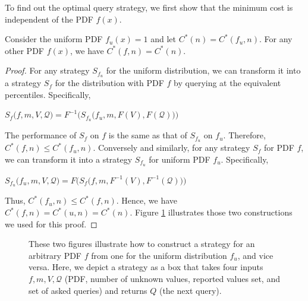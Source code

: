 To find out the optimal query strategy, we first show that the minimum cost
is independent of the PDF $f(x)$.

\begin{lemma}\label{lemma:uniform}
Consider the uniform PDF $f_u(x) = 1$ and let $C^*(n) = C^*(f_u, n)$.
For any other PDF $f(x)$, we have $C^*(f, n) =  C^*(n)$.
\end{lemma}


\begin{proof}
For any strategy $S_{f_u}$ for the uniform distribution, we can transform
it into a strategy $S_f$ for the distribution  with PDF $f$ 
by querying at the equivalent percentiles. Specifically, 

$
S_f\big(f, m, V, \mathcal Q \big) = F^{-1}\Big( S_{f_u}\big( f_u, m, F(V), F (\mathcal Q) \big) \Big)
$

The performance of $S_f$ on $f$ is the same as that of $S_{f_u}$ on $f_u$.
Therefore,  $C^*(f, n) \leq C^*(f_u, n)$.
Conversely and similarly, for any strategy $S_f$
for PDF $f$, we can transform it into a strategy $S_{f_u}$ for uniform PDF
$f_u$. Specifically,

$
S_{f_u}\big(f_u, m, V, \mathcal Q \big) = F\Big( S_f\big( f, m, F^{-1}(V), F^{-1} (\mathcal Q) \big) \Big)
$

Thus, $C^*(f_u, n) \leq C^*(f, n)$.  Hence,  we have $C^*(f, n) = C^*(u, n)
= C^*(n)$. Figure \ref{fig:uniform} 
illustrates those two constructions we used for this proof.
\end{proof}

\begin{figure}
\centering
  \caption{These two figures illustrate how to construct a strategy for an
    arbitrary PDF $f$ from one for the uniform distribution $f_u$, and vice versa.
Here, we depict a strategy as a box that takes four inputs $f, m, V,
  \mathcal Q$ (PDF, number of unknown values, reported values set, and set of asked
  queries) and returns $Q$ (the next query).} \label{fig:uniform}
\end{figure}


